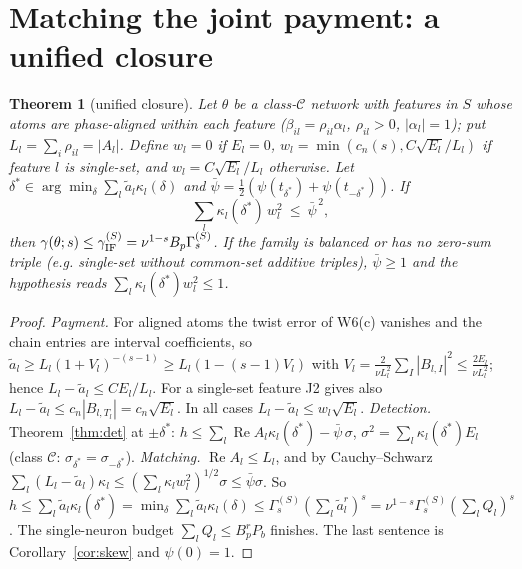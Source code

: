 \documentclass[11pt]{article}
\newtheorem{theorem}{Theorem}
\theoremstyle{remark}
\renewcommand{\Re}{\operatorname{Re}}
\begin{document}
\section{Matching the joint payment: a unified closure}

\begin{theorem}[unified closure]\label{thm:clo}
Let $\theta$ be a class-$\mathcal C$ network with features in $S$ whose atoms are phase-aligned within each feature ($\beta_{il}=\rho_{il}\alpha_l$,
$\rho_{il}>0$, $|\alpha_l|=1$); put $L_l=\sum_i\rho_{il}=|A_l|$. Define $w_l=0$ if $E_l=0$, $w_l=\min(c_n(s),C\sqrt{E_l}/L_l)$ if feature $l$ is
single-set, and $w_l=C\sqrt{E_l}/L_l$ otherwise. Let $\delta^*\in\arg\min_\delta\sum_l\tilde a_l\kappa_l(\delta)$ and
$\bar\psi=\frac12(\psi(t_{\delta^*})+\psi(t_{-\delta^*}))$. If
\[ \sum_{l}\kappa_l(\delta^*)\,w_l^2\ \le\ \bar\psi^{\,2}, \]
then $\gamma(\theta;s)\le\gamma^{(S)}_{\rm IF}=\nu^{1-s}B_p\Gamma^{(S)}_s$. If the family is balanced or has no zero-sum triple
(e.g. single-set without common-set additive triples), $\bar\psi\ge1$ and the hypothesis reads $\sum_l\kappa_l(\delta^*)w_l^2\le1$.
\end{theorem}
\begin{proof}
\emph{Payment.} For aligned atoms the twist error of W6(c) vanishes and the chain entries are interval coefficients, so
$\tilde a_l\ge L_l(1+V_l)^{-(s-1)}\ge L_l(1-(s-1)V_l)$ with $V_l=\frac2{\nu L_l^2}\sum_{I}|B_{l,I}|^2\le\frac{2E_l}{\nu L_l^2}$; hence
$L_l-\tilde a_l\le CE_l/L_l$. For a single-set feature J2 gives also $L_l-\tilde a_l\le c_n|B_{l,T_l}|=c_n\sqrt{E_l}$. In all cases
$L_l-\tilde a_l\le w_l\sqrt{E_l}$.
\emph{Detection.} Theorem~\ref{thm:det} at $\pm\delta^*$: $h\le\sum_l\Re A_l\kappa_l(\delta^*)-\bar\psi\,\sigma$, $\sigma^2=\sum_l\kappa_l(\delta^*)E_l$
(class $\mathcal C$: $\sigma_{\delta^*}=\sigma_{-\delta^*}$).
\emph{Matching.} $\Re A_l\le L_l$, and by Cauchy--Schwarz
$\sum_l(L_l-\tilde a_l)\kappa_l\le(\sum_l\kappa_lw_l^2)^{1/2}\sigma\le\bar\psi\sigma$. So
$h\le\sum_l\tilde a_l\kappa_l(\delta^*)=\min_\delta\sum_l\tilde a_l\kappa_l(\delta)\le\Gamma^{(S)}_s(\sum_l\tilde a_l^r)^s=\nu^{1-s}\Gamma^{(S)}_s(\sum_lQ_l)^s$.
The single-neuron budget $\sum_lQ_l\le B_p^rP_b$ finishes. The last sentence is Corollary~\ref{cor:skew} and $\psi(0)=1$.
\end{proof}
\end{document}
